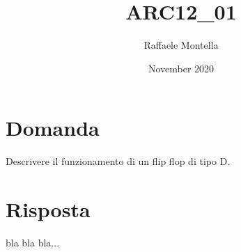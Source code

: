 \documentclass{article}
\title{ARC12\_01}
\author{Raffaele Montella}
\date{November 2020}
\begin{document}
\maketitle

\section{Domanda}
Descrivere il funzionamento di un flip flop di tipo D.
\section{Risposta}
bla bla bla...\cite{cushing1991edge}



\end{document}
